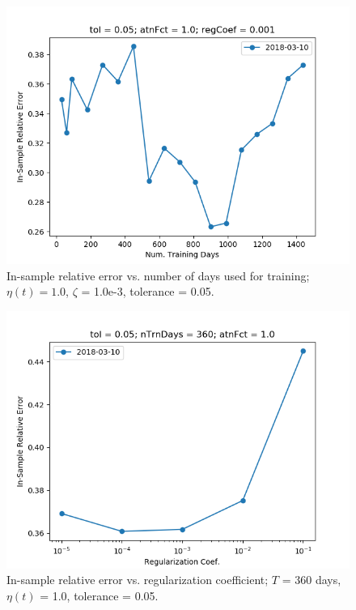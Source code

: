 \documentclass{article}
\begin{document}
\begin{figure}
\includegraphics[scale=0.9,bb=0 0 640 480]{figures/nTrnDays-sensitivity-error.png}
\caption{In-sample relative error vs. number of days used for
  training; $\eta(t) = 1.0$, $\zeta$ = 1.0e-3, tolerance = 0.05.}
\label{fig:nTrnDays-sensitivity-error}
\end{figure}

\begin{figure}
\includegraphics[scale=0.9,bb=0 0 640 480]{figures/regCoef-sensitivity-error.png}
\caption{In-sample relative error vs. regularization coefficient; $T$
  = 360 days, $\eta(t)$ = 1.0, tolerance = 0.05.}
\label{fig:regCoef-sensitivity-error}
\end{figure}
\end{document}
